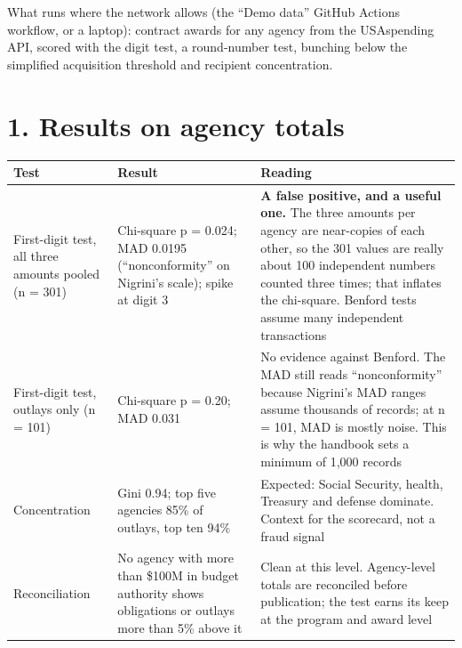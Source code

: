 \documentclass[letterpaper,11pt]{article}
\begin{document}
What runs where the network allows (the ``Demo data'' GitHub Actions
workflow, or a laptop): contract awards for any agency from the
USAspending API, scored with the digit test, a round-number test,
bunching below the simplified acquisition threshold and recipient
concentration.

\hypertarget{results-on-agency-totals}{%
\section*{1. Results on agency totals}\label{results-on-agency-totals}}

\begingroup\small\setlength{\tabcolsep}{4pt}\renewcommand{\arraystretch}{1.25}
\begin{longtable}[l]{@{}>{\raggedright\arraybackslash}p{}>{\raggedright\arraybackslash}p{}>{\raggedright\arraybackslash}p{}@{}}
\rowcolor{coolblack}\leavevmode\color{white}\bfseries Test & \leavevmode\color{white}\bfseries Result & \leavevmode\color{white}\bfseries Reading \\
\endhead
First-digit test, all three amounts pooled (n = 301) & Chi-square p = 0.024; MAD 0.0195 (``nonconformity'' on Nigrini's scale); spike at digit 3 & \textbf{A false positive, and a useful one.} The three amounts per agency are near-copies of each other, so the 301 values are really about 100 independent numbers counted three times; that inflates the chi-square. Benford tests assume many independent transactions \\
First-digit test, outlays only (n = 101) & Chi-square p = 0.20; MAD 0.031 & No evidence against Benford. The MAD still reads ``nonconformity'' because Nigrini's MAD ranges assume thousands of records; at n = 101, MAD is mostly noise. This is why the handbook sets a minimum of 1,000 records \\
Concentration & Gini 0.94; top five agencies 85\% of outlays, top ten 94\% & Expected: Social Security, health, Treasury and defense dominate. Context for the scorecard, not a fraud signal \\
Reconciliation & No agency with more than \$100M in budget authority shows obligations or outlays more than 5\% above it & Clean at this level. Agency-level totals are reconciled before publication; the test earns its keep at the program and award level \\
\end{longtable}\endgroup
\end{document}
